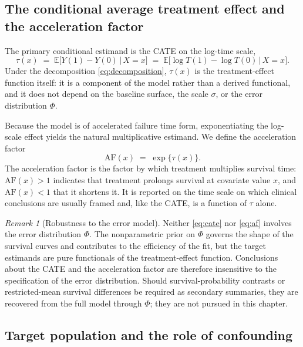 \documentclass[11pt]{report}
\theoremstyle{plain}
\theoremstyle{definition}
\theoremstyle{remark}
\newcommand{\E}{\mathbb{E}}
\newcommand{\1}{\mathds{1}}
\theoremstyle{plain}
\theoremstyle{remark}
\newtheorem{remark}[theorem]{Remark}
\newcommand{\given}{\,\vert\,}
\newcommand{\af}{\mathrm{AF}}
\begin{document}
\subsection{The conditional average treatment effect and the acceleration factor}

The primary conditional estimand is the CATE on the log-time scale,
\begin{equation}
\label{eq:cate}
\tau(x) \;=\; \E\bigl[Y(1) - Y(0) \given X = x\bigr]
        \;=\; \E\bigl[\log T(1) - \log T(0) \given X = x\bigr].
\end{equation}
Under the decomposition \eqref{eq:decomposition}, $\tau(x)$ is the
treatment-effect function itself: it is a component of the model rather than a
derived functional, and it does not depend on the baseline surface, the scale
$\sigma$, or the error distribution $\Phi$.

Because the model is of accelerated failure time form, exponentiating the
log-scale effect yields the natural multiplicative estimand. We define the
acceleration factor
\begin{equation}
\label{eq:af}
\af(x) \;=\; \exp\{\tau(x)\}.
\end{equation}
The acceleration factor is the factor by which treatment multiplies survival
time: $\af(x) > 1$ indicates that treatment prolongs survival at covariate value
$x$, and $\af(x) < 1$ that it shortens it. It is reported on the time scale on
which clinical conclusions are usually framed and, like the CATE, is a function
of $\tau$ alone.

\begin{remark}[Robustness to the error model]
\label{rem:phi-free}
Neither \eqref{eq:cate} nor \eqref{eq:af} involves the error distribution
$\Phi$. The nonparametric prior on $\Phi$ governs the shape of the survival
curves and contributes to the efficiency of the fit, but the target estimands
are pure functionals of the treatment-effect function. Conclusions about the
CATE and the acceleration factor are therefore insensitive to the specification
of the error distribution. Should survival-probability contrasts or
restricted-mean survival differences be required as secondary summaries, they
are recovered from the full model through $\Phi$; they are not pursued in this
chapter.
\end{remark}

\subsection{Target population and the role of confounding}
\label{subsec:target-pop}
\end{document}
